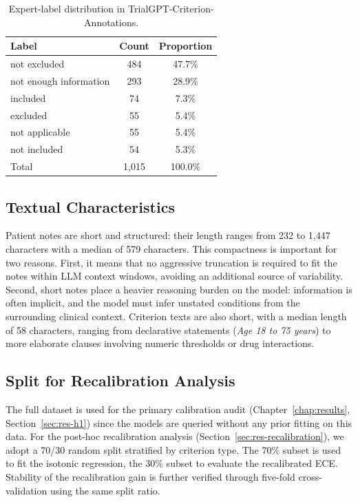 \begin{table}[htbp]
    \centering
    \caption{Expert-label distribution in TrialGPT-Criterion-Annotations.}
    \label{tab:met-label-freq}
    \begin{tabular}{@{}lcc@{}}
        \toprule
        \textbf{Label} & \textbf{Count} & \textbf{Proportion} \\
        \midrule
        not excluded & 484 & 47.7\% \\
        not enough information & 293 & 28.9\% \\
        included & 74 & 7.3\% \\
        excluded & 55 & 5.4\% \\
        not applicable & 55 & 5.4\% \\
        not included & 54 & 5.3\% \\
        \midrule
        Total & 1{,}015 & 100.0\% \\
        \bottomrule
    \end{tabular}
\end{table}

\subsection{Textual Characteristics}
\label{subsec:met-data-text}

Patient notes are short and structured: their length ranges from 232 to 
1{,}447 characters with a median of 579 characters. This compactness is 
important for two reasons. First, it means that no aggressive truncation is 
required to fit the notes within LLM context windows, avoiding an additional 
source of variability. Second, short notes place a heavier reasoning burden 
on the model: information is often implicit, and the model must infer 
unstated conditions from the surrounding clinical context. Criterion texts 
are also short, with a median length of 58 characters, ranging from 
declarative statements (\emph{Age 18 to 75 years}) to more elaborate clauses 
involving numeric thresholds or drug interactions.

\subsection{Split for Recalibration Analysis}
\label{subsec:met-data-split}

The full dataset is used for the primary calibration audit (Chapter~\ref{chap:results}, 
Section~\ref{sec:res-h1}) since the models are queried without any prior 
fitting on this data. For the post-hoc recalibration analysis 
(Section~\ref{sec:res-recalibration}), we adopt a 70/30 random split 
stratified by criterion type. The 70\% subset is used to fit the isotonic 
regression, the 30\% subset to evaluate the recalibrated ECE. Stability of 
the recalibration gain is further verified through five-fold cross-validation 
using the same split ratio.


